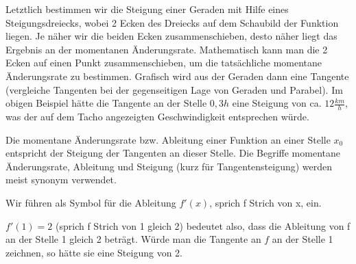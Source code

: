 Letztlich bestimmen wir die Steigung einer Geraden mit Hilfe eines Steigungsdreiecks, wobei 2 Ecken des Dreiecks auf dem Schaubild der Funktion liegen. Je näher wir die beiden Ecken zusammenschieben, desto näher liegt das Ergebnis an der momentanen Änderungsrate. Mathematisch kann man die 2 Ecken auf einen Punkt zusammenschieben, um die tatsächliche momentane Änderungsrate zu bestimmen. Grafisch wird aus der Geraden dann eine Tangente (vergleiche Tangenten bei der gegenseitigen Lage von Geraden und Parabel). Im obigen Beispiel hätte die Tangente an der Stelle \(0,3h\) eine Steigung von ca. \(12\frac{km}{h}\), was der auf dem Tacho angezeigten Geschwindigkeit entsprechen würde.\newpage
\begin{tcolorbox}

    \bigskip

	\textcolor{loestc}{Die momentane Änderungsrate bzw. Ableitung einer Funktion an einer Stelle \(x_0\) entspricht der Steigung der Tangenten an dieser Stelle. Die Begriffe momentane Änderungsrate, Ableitung und Steigung (kurz für Tangentensteigung) werden meist synonym verwendet.}

    \bigskip

\end{tcolorbox}
\begin{minipage}{\textwidth}
\end{minipage}
\begin{tcolorbox}

    \bigskip

	\textcolor{loestc}{Wir führen als Symbol für die Ableitung \(f'(x)\), sprich f Strich von x, ein.}

	\textcolor{loestc}{\(f'(1)=2\) (sprich f Strich von 1 gleich 2) bedeutet also, dass die Ableitung von f an der Stelle 1 gleich 2 beträgt. Würde man die Tangente an \(f\) an der Stelle 1 zeichnen, so hätte sie eine Steigung von 2.}

    \bigskip

\end{tcolorbox}
